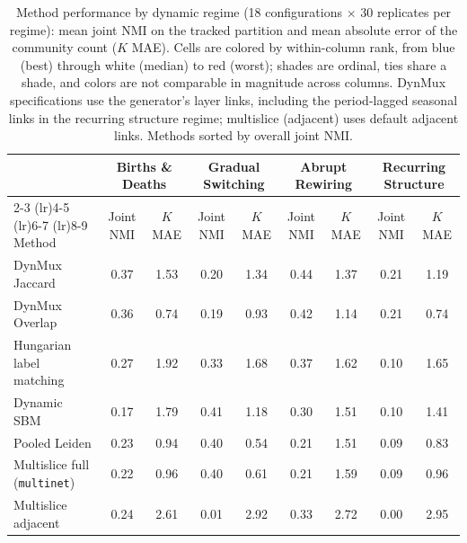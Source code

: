 \documentclass[11pt, letterpaper]{article}
\begin{document}
\begin{table}[t]
\scriptsize
\centering
\caption{Method performance by dynamic regime (18 configurations $\times$ 30 replicates per regime): mean joint NMI on the tracked partition and mean absolute error of the community count ($K$ MAE). Cells are colored by within-column rank, from blue (best) through white (median) to red (worst); shades are ordinal, ties share a shade, and colors are not comparable in magnitude across columns. DynMux specifications use the generator's layer links, including the period-lagged seasonal links in the recurring structure regime; multislice (adjacent) uses default adjacent links. Methods sorted by overall joint NMI.}
\label{tab:metrics_wide}
\begin{tabular}{lcccccccc}
\toprule
& \multicolumn{2}{c}{Births \& Deaths} & \multicolumn{2}{c}{Gradual Switching} & \multicolumn{2}{c}{Abrupt Rewiring} & \multicolumn{2}{c}{Recurring Structure} \\
\cmidrule(lr){2-3} \cmidrule(lr){4-5} \cmidrule(lr){6-7} \cmidrule(lr){8-9}
Method & Joint NMI & $K$ MAE & Joint NMI & $K$ MAE & Joint NMI & $K$ MAE & Joint NMI & $K$ MAE \\
\midrule
DynMux Jaccard & \cellcolor{blue!30}0.37 & 1.53 & \cellcolor{red!10}0.20 & \cellcolor{red!10}1.34 & \cellcolor{blue!30}0.44 & \cellcolor{blue!20}1.37 & \cellcolor{blue!30}0.21 & 1.19 \\
DynMux Overlap & \cellcolor{blue!20}0.36 & \cellcolor{blue!30}0.74 & \cellcolor{red!20}0.19 & \cellcolor{blue!10}0.93 & \cellcolor{blue!20}0.42 & \cellcolor{blue!30}1.14 & \cellcolor{blue!20}0.21 & \cellcolor{blue!30}0.74 \\
Hungarian label matching & \cellcolor{blue!10}0.27 & \cellcolor{red!20}1.92 & 0.33 & \cellcolor{red!20}1.68 & \cellcolor{blue!10}0.37 & \cellcolor{red!20}1.62 & 0.10 & \cellcolor{red!20}1.65 \\
Dynamic SBM & \cellcolor{red!30}0.17 & \cellcolor{red!10}1.79 & \cellcolor{blue!30}0.41 & 1.18 & \cellcolor{red!10}0.30 & \cellcolor{blue!10}1.51 & \cellcolor{blue!10}0.10 & \cellcolor{red!10}1.41 \\
Pooled Leiden & \cellcolor{red!10}0.23 & \cellcolor{blue!20}0.94 & \cellcolor{blue!20}0.40 & \cellcolor{blue!30}0.54 & \cellcolor{red!20}0.21 & \cellcolor{blue!10}1.51 & \cellcolor{red!10}0.09 & \cellcolor{blue!20}0.83 \\
Multislice full (\texttt{multinet}) & \cellcolor{red!20}0.22 & \cellcolor{blue!10}0.96 & \cellcolor{blue!10}0.40 & \cellcolor{blue!20}0.61 & \cellcolor{red!30}0.21 & \cellcolor{red!10}1.59 & \cellcolor{red!20}0.09 & \cellcolor{blue!10}0.96 \\
Multislice adjacent  & 0.24 & \cellcolor{red!30}2.61 & \cellcolor{red!30}0.01 & \cellcolor{red!30}2.92 & 0.33 & \cellcolor{red!30}2.72 & \cellcolor{red!30}0.00 & \cellcolor{red!30}2.95 \\
\bottomrule
\end{tabular}
\end{table}
\end{document}
